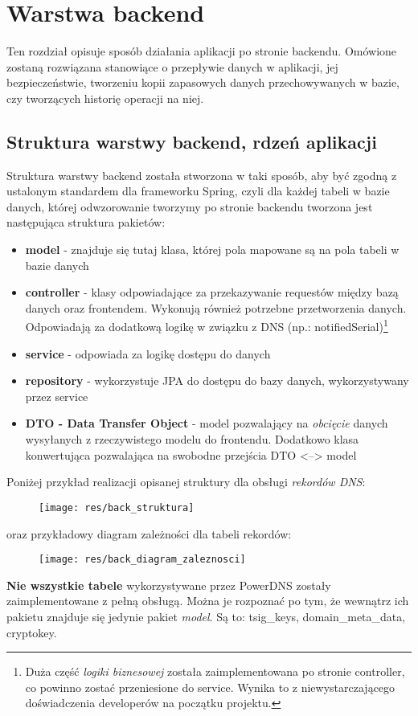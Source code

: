 \documentclass[11pt]{article}
\begin{document}
\section{Warstwa backend}
Ten rozdział opisuje sposób działania aplikacji po stronie backendu. Omówione zostaną rozwiązana stanowiące o przepływie danych w aplikacji, jej bezpieczeństwie, tworzeniu kopii zapasowych danych przechowywanych w bazie, czy tworzących historię operacji na niej.

\subsection{Struktura warstwy backend, rdzeń aplikacji}
Struktura warstwy backend została stworzona w taki sposób, aby być zgodną z ustalonym standardem dla frameworku Spring, czyli dla każdej tabeli w bazie danych, której odwzorowanie tworzymy po stronie backendu tworzona jest następująca struktura pakietów:
\begin{itemize}
\item \textbf{model} - znajduje się tutaj klasa, której pola mapowane są na pola tabeli w bazie danych
\item \textbf{controller} - klasy odpowiadające za przekazywanie requestów między bazą danych oraz frontendem. Wykonują również potrzebne przetworzenia danych. Odpowiadają za dodatkową logikę w związku z DNS (np.: notifiedSerial)\footnote{Duża część \emph{logiki biznesowej} została zaimplementowana po stronie controller, co powinno zostać przeniesione do service. Wynika to z niewystarczającego doświadczenia developerów na początku projektu.}
\item \textbf{service} - odpowiada za logikę dostępu do danych
\item \textbf{repository} - wykorzystuje JPA do dostępu do bazy danych, wykorzystywany przez service
\item \textbf{DTO - Data Transfer Object} - model pozwalający na \emph{obcięcie} danych wysyłanych z rzeczywistego modelu do frontendu. Dodatkowo klasa konwertująca pozwalająca na swobodne przejścia DTO <--> model
\end{itemize}
Poniżej przykład realizacji opisanej struktury dla obsługi \emph{rekordów DNS}:
\begin{figure}[H]
\centering
\texttt{[image: res/back\_struktura]}
\end{figure}
oraz przykładowy diagram zależności dla tabeli rekordów:
\begin{figure}[H]
\centering
\texttt{[image: res/back\_diagram\_zaleznosci]}
\end{figure}
\textbf{Nie wszystkie tabele} wykorzystywane przez PowerDNS zostały zaimplementowane z pełną obsługą. Można je rozpoznać po tym, że wewnątrz ich pakietu znajduje się jedynie pakiet \emph{model}. Są to: tsig\_keys, domain\_meta\_data, cryptokey. 
\end{document}
